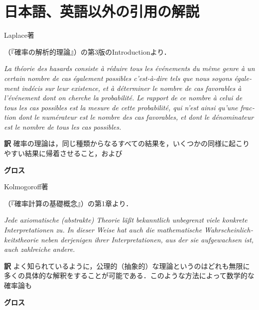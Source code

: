 \documentclass[main.tex]{subfiles}
\begin{document}
\chapter{日本語、英語以外の引用の解説}

\begin{quotebox}
\begin{numberedquote}
Laplace著\begin{french}\end{french}（『確率の解析的理論』）の第3版のIntroductionより．

\bigskip

\begin{french}
{\itshape
La théorie des hasards consiste à réduire tous les événements du même genre à un certain nombre
de cas également possibles c'est-à-dire tels que nous soyons également indécis sur leur existence,
et à déterminer le nombre de cas favorables à l'événement dont on cherche la probabilité.
Le rapport de ce nombre à celui de tous les cas possibles est la mesure de cette probabilité,
qui n'est ainsi qu'une fraction dont le numérateur est le nombre des cas favorables,
et dont le dénominateur est le nombre de tous les cas possibles.}
\end{french}

\end{numberedquote}
\end{quotebox}

\noindent \textbf{\gtfamily 訳} 確率の理論は，同じ種類からなるすべての結果を，いくつかの同様に起こりやすい結果に帰着させること，および


\noindent \textbf{\gtfamily グロス}


\begin{quotebox}
\begin{numberedquote}
Kolmogoroff著\begin{german}\end{german}（『確率計算の基礎概念』）の第1章より．

\bigskip

\begin{german}
{\itshape
Jede axiomatische (abstrakte) Theorie läßt
bekanntlich unbegrenzt viele konkrete Interpretationen zu.
In dieser Weise hat auch die mathematische Wahrscheinlichkeitstheorie
neben derjenigen ihrer Interpretationen,
aus der sie aufgewachsen ist,
auch zahlreiche andere.}
\end{german}
\end{numberedquote}
\end{quotebox}

\noindent \textbf{\gtfamily 訳} よく知られているように，公理的（抽象的）な理論というのはどれも無限に多くの具体的な解釈をすることが可能である．このような方法によって数学的な確率論も

\noindent \textbf{\gtfamily グロス}

\end{document}
